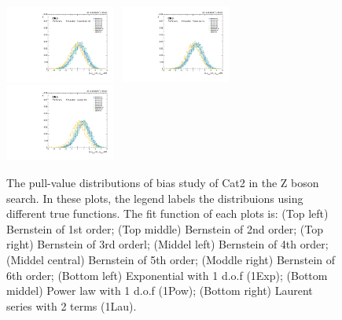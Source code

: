 \begin{figure}[p]
  \includegraphics[width=0.32\textwidth]{Fig/BiasStudy/Pull/ZJpsiG_Cat2/pull_fitfunc6_leastbias}~
  \includegraphics[width=0.32\textwidth]{Fig/BiasStudy/Pull/ZJpsiG_Cat2/pull_fitfunc7_leastbias}~
  \includegraphics[width=0.32\textwidth]{Fig/BiasStudy/Pull/ZJpsiG_Cat2/pull_fitfunc8_leastbias}\\
  \caption{The pull-value distributions of bias study of Cat2 in the Z boson search. In these plots, the legend labels the distribuions using different true functions. The fit function of each plots is: (Top left) Bernstein of 1st order; (Top middle) Bernstein of 2nd order; (Top right) Bernstein of 3rd orderl; (Middel left) Bernstein of 4th order; (Middel central) Bernstein of 5th order; (Moddle right) Bernstein of 6th order; (Bottom left) Exponential with 1 d.o.f (1Exp); (Bottom middel) Power law with 1 d.o.f (1Pow); (Bottom right) Laurent series with 2 terms (1Lau).}
  \label{fig:Pull_ZJpsiG_Cat2_v2}
\end{figure}

